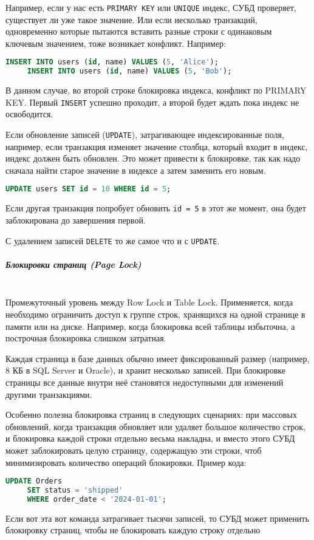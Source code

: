  Например, если у нас есть \texttt{PRIMARY KEY} или \texttt{UNIQUE} индекс, СУБД проверяет, существует ли уже такое значение. Или если несколько транзакций, одновременно которые пытаются вставить разные строки с одинаковым ключевым значением, тоже возникает конфликт. Например:
 \begin{lstlisting}[language=SQL]
     INSERT INTO users (id, name) VALUES (5, 'Alice');
     INSERT INTO users (id, name) VALUES (5, 'Bob');
 \end{lstlisting}
 В данном случае, во второй строке блокировка индекса, конфликт по PRIMARY KEY. Первый \texttt{INSERT} успешно проходит, а второй будет ждать пока индекс не освободится.
 
 Если обновление записей (\texttt{UPDATE}), затрагивающее индексированные поля, например, если транзакция изменяет значение столбца, который входит в индекс, индекс должен быть обновлен. Это может привести к блокировке, так как надо сначала найти старое значение в индексе а затем заменить его новым.
 \begin{lstlisting}[language=SQL]
     UPDATE users SET id = 10 WHERE id = 5;
 \end{lstlisting}
 Если другая транзакция попробует обновить \texttt{id = 5} в этот же момент, она будет заблокирована до завершения первой.
 
 С удалением записей \texttt{DELETE} то же самое что и с \texttt{UPDATE}.
 
 \subparagraph{Блокировки страниц (Page Lock)} ~\\
 Промежуточный уровень между Row Lock и Table Lock. Применяется, когда необходимо ограничить доступ к группе строк, хранящихся на одной странице в памяти или на диске. Например, когда блокировка всей таблицы избыточна, а построчная блокировка слишком затратная.
 
 Каждая страница в базе данных обычно имеет фиксированный размер (например, 8 КБ в SQL Server и Oracle), и хранит несколько записей. При блокировке страницы все данные внутри неё становятся недоступными для изменений другими транзакциями.
 
 Особенно полезна блокировка страниц в следующих сценариях: при массовых обновлений, когда транзакция обновляет или удаляет большое количество строк, и блокировка каждой строки отдельно весьма накладна, и вместо этого СУБД может заблокировать целую страницу, содержащую эти строки, чтоб минимизировать количество операций блокировки.
 Пример кода:
 \begin{lstlisting}[language=SQL]
     UPDATE Orders
     SET status = 'shipped' 
     WHERE order_date < '2024-01-01';
 \end{lstlisting}
 Если вот эта вот команда затрагивает тысячи записей, то СУБД может применить блокировку страниц, чтобы не блокировать каждую строку отдельно
 
